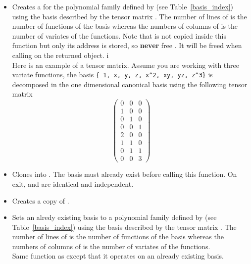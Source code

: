 \begin{itemize}
\item {}
  \sshortdescribe Creates a  for the polynomial family
  defined by  (see Table~\ref{basis_index}) using the basis
  described by the tensor matrix . The number of lines of  is
  the number of functions of the basis whereas the numbers of columns of
   is the number of variates of the functions.
  Note that  is not copied inside this function but only its address is
  stored, so {\bf never} free . It will be freed when calling
   on the returned object. i\\
  Here is an example of a tensor matrix. Assume you are working with three
  variate functions, the basis \verb!{ 1, x, y, z, x^2, xy, yz, z^3}! is
  decomposed in the one dimensional canonical basis using the following tensor
  matrix
  \[ \left(
    \begin{array}{ccc}
      0 & 0 & 0 \\
      1 & 0 & 0 \\
      0 & 1 & 0 \\
      0 & 0 & 1 \\
      2 & 0 & 0 \\
      1 & 1 & 0 \\
      0 & 1 & 1\\
      0 & 0 & 3
    \end{array}
  \right) \]

\item {}
  \sshortdescribe Clones  into . The basis  must
  already exist before calling this function. On exit,  and 
  are identical and independent.
\item {}
  \sshortdescribe Creates a copy of .
\item {}
  \sshortdescribe Sets an alredy existing basis  to a polynomial family
  defined by  (see Table~\ref{basis_index}) using the basis
  described by the tensor matrix . The number of lines of  is
  the number of functions of the basis whereas the numbers of columns of
   is the number of variates of the functions. \\
  Same function as  except that it
  operates on an already existing basis.


\end{itemize}
